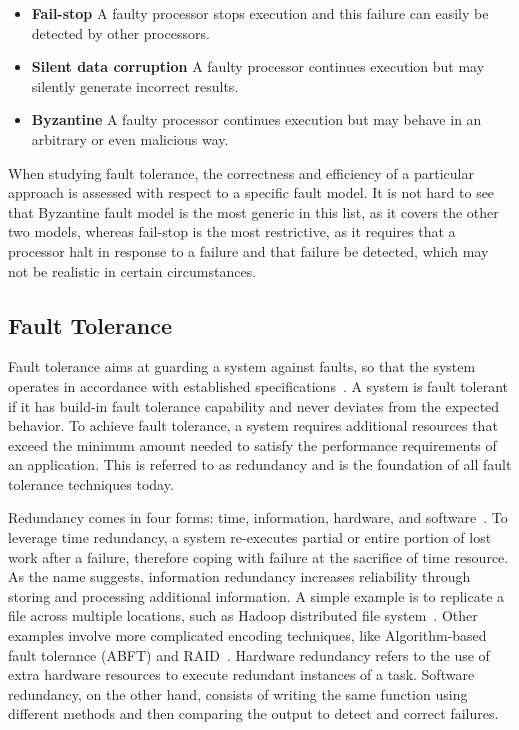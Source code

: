 \begin{itemize}
	\item \textbf{Fail-stop} A faulty processor stops execution and this failure can easily be detected by other processors. 
    \item \textbf{Silent data corruption} A faulty processor continues execution but may silently generate incorrect results. 
    \item \textbf{Byzantine} A faulty processor continues execution but may behave in an arbitrary or even malicious way.
\end{itemize}

When studying fault tolerance, the correctness and efficiency of a particular approach is assessed with respect to a specific fault model. 
It is not hard to see that Byzantine fault model is the most generic in this list, as it covers the other two models, whereas fail-stop is the most restrictive, as it requires that a processor halt in response to a failure and that failure be detected, which may not be realistic in certain circumstances. 

\subsection{Fault Tolerance}
Fault tolerance aims at guarding a system against faults, so that the system operates in accordance with established specifications~\cite{laprie1985dependable}. A system is fault tolerant if it has build-in fault tolerance capability and never deviates from the expected behavior. To achieve fault tolerance, a system requires additional resources that exceed the minimum amount needed to satisfy the performance requirements of an application. This is referred to as redundancy and is the foundation of all fault tolerance techniques today.  

Redundancy comes in four forms: time, information, hardware, and software~\cite{koren2010fault}. To leverage time redundancy, a system re-executes partial or entire portion of lost work after a failure, therefore coping with failure at the sacrifice of time resource. As the name suggests, information redundancy increases reliability through storing and processing additional information. A simple example is to replicate a file across multiple locations, such as Hadoop distributed file system~\cite{hdfs2014}. Other examples involve more complicated encoding techniques, like Algorithm-based fault tolerance (ABFT) and RAID~\cite{huang1984algorithm,patterson1988case}. Hardware redundancy refers to the use of extra hardware resources to execute redundant instances of a task. Software redundancy, on the other hand, consists of writing the same function using different methods and then comparing the output to detect and correct failures. 

